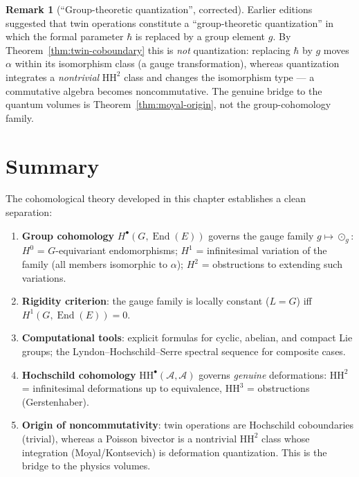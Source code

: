 \documentclass[11pt,a4paper,openany]{book}
\theoremstyle{plain}
\theoremstyle{definition}
\newtheorem{remark}[theorem]{Remark}
\newcommand{\twing}[1]{\odot_{#1}}
\newcommand{\lingroup}{L}
\newcommand{\actspace}{E}
\newcommand{\groupG}{G}
\DeclareMathOperator{\End}{End}
\begin{document}
\begin{remark}[``Group-theoretic quantization'', corrected]\label{rem:group-quant}
Earlier editions suggested that twin operations constitute a ``group-theoretic quantization'' in which the formal parameter $\hbar$ is replaced by a group element $g$. By Theorem~\ref{thm:twin-coboundary} this is \emph{not} quantization: replacing $\hbar$ by $g$ moves $\alpha$ within its isomorphism class (a gauge transformation), whereas quantization integrates a \emph{nontrivial} $\mathrm{HH}^2$ class and changes the isomorphism type --- a commutative algebra becomes noncommutative. The genuine bridge to the quantum volumes is Theorem~\ref{thm:moyal-origin}, not the group-cohomology family.
\end{remark}

\section{Summary}

The cohomological theory developed in this chapter establishes a clean separation:
\begin{enumerate}
    \item \textbf{Group cohomology} $H^\bullet(\groupG,\End(\actspace))$ governs the gauge family $g\mapsto\twing{g}$: $H^0$ = $\groupG$-equivariant endomorphisms; $H^1$ = infinitesimal variation of the family (all members isomorphic to $\alpha$); $H^2$ = obstructions to extending such variations.
    \item \textbf{Rigidity criterion}: the gauge family is locally constant ($\lingroup=\groupG$) iff $H^1(\groupG,\End(\actspace))=0$.
    \item \textbf{Computational tools}: explicit formulas for cyclic, abelian, and compact Lie groups; the Lyndon--Hochschild--Serre spectral sequence for composite cases.
    \item \textbf{Hochschild cohomology} $\mathrm{HH}^\bullet(\mathcal{A},\mathcal{A})$ governs \emph{genuine} deformations: $\mathrm{HH}^2$ = infinitesimal deformations up to equivalence, $\mathrm{HH}^3$ = obstructions (Gerstenhaber).
    \item \textbf{Origin of noncommutativity}: twin operations are Hochschild coboundaries (trivial), whereas a Poisson bivector is a nontrivial $\mathrm{HH}^2$ class whose integration (Moyal/Kontsevich) is deformation quantization. This is the bridge to the physics volumes.
\end{enumerate}


\end{document}
